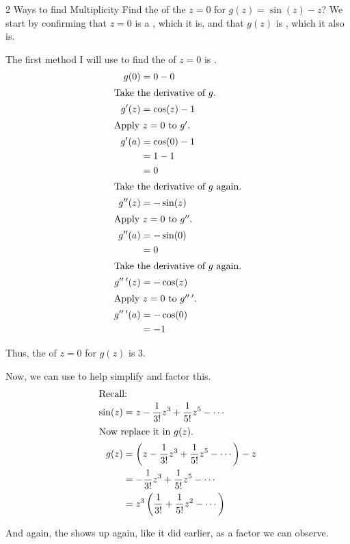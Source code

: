 \begin{example}{2 Ways to find Multiplicity}
  Find the  of the  $z=0$ for $g(z) = \sin(z) - z$?
  \tcblower{}
  We start by confirming that $z=0$ is a , which it is, and that $g(z)$ is , which it also is.

  The first method I will use to find the  of $z=0$ is .
  \begin{align*}
    g(0) &= 0 - 0 \\
    \shortintertext{Take the derivative of $g$.}
    g'(z) &= \cos(z) - 1 \\
    \shortintertext{Apply $z=0$ to $g'$.}
    g'(a) &= \cos(0) - 1 \\
         &= 1 - 1 \\
         &= 0 \\
    \shortintertext{Take the derivative of $g$ again.}
    g''(z) &= -\sin(z) \\
    \shortintertext{Apply $z=0$ to $g''$.}
    g''(a) &= -\sin(0) \\
         &= 0 \\
    \shortintertext{Take the derivative of $g$ again.}
    g''\,'(z) &= -\cos(z) \\
    \shortintertext{Apply $z=0$ to $g''\,'$.}
    g''\,'(a) &= -\cos(0) \\
         &= -1 \\
  \end{align*}

  Thus, the  of $z=0$ for $g(z)$ is 3.

  Now, we can use  to help simplify and factor this.
  \begin{align*}
    \shortintertext{Recall:}
    \sin(z) &= z - \frac{1}{3!} z^{3} + \frac{1}{5!} z^{5} - \cdots \\
    \shortintertext{Now replace it in $g(z)$.}
    g(z) &= \left( z- \frac{1}{3!} z^{3} + \frac{1}{5!} z^{5} - \cdots \right) - z \\
            &= -\frac{1}{3!} z^{3} + \frac{1}{5!} z^{5} - \cdots \\
            &= z^{3} \left( \frac{1}{3!} + \frac{1}{5!} z^{2} - \cdots \right) \\
  \end{align*}

  And again, the  shows up again, like it did earlier, as a factor we can observe.
\end{example}


